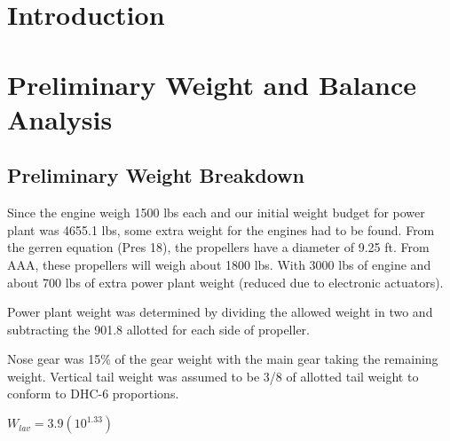\documentclass[conf]{new-aiaa}
\begin{document}
\section{Introduction}

\section{Preliminary Weight and Balance Analysis}
\subsection{Preliminary Weight Breakdown}
Since the engine weigh 1500 lbs each and our initial weight budget for power plant was 4655.1 lbs, some extra weight for the engines had to be found.
From the gerren equation (Pres 18), the propellers have a diameter of 9.25 ft. From AAA, these propellers will weigh about 1800 lbs. With 3000 lbs of engine and about 700 lbs of extra power plant weight (reduced due to electronic actuators).

Power plant weight was determined by dividing the allowed weight in two and subtracting the 901.8 allotted for each side of propeller.

Nose gear was 15\% of the gear weight with the main gear taking the remaining weight. Vertical tail weight was assumed to be 3/8 of allotted tail weight to conform to DHC-6 proportions.

$W_{lav} = 3.9(10^1.33)$

\end{document}

